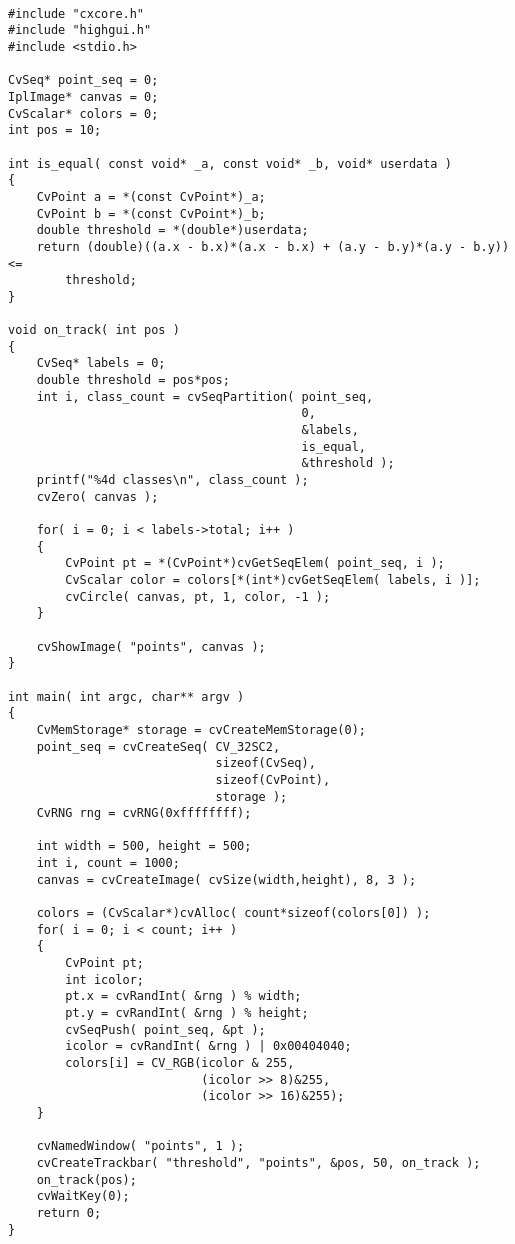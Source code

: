 \begin{lstlisting}

#include "cxcore.h"
#include "highgui.h"
#include <stdio.h>

CvSeq* point_seq = 0;
IplImage* canvas = 0;
CvScalar* colors = 0;
int pos = 10;

int is_equal( const void* _a, const void* _b, void* userdata )
{
    CvPoint a = *(const CvPoint*)_a;
    CvPoint b = *(const CvPoint*)_b;
    double threshold = *(double*)userdata;
    return (double)((a.x - b.x)*(a.x - b.x) + (a.y - b.y)*(a.y - b.y)) <=
        threshold;
}

void on_track( int pos )
{
    CvSeq* labels = 0;
    double threshold = pos*pos;
    int i, class_count = cvSeqPartition( point_seq,
                                         0,
                                         &labels,
                                         is_equal,
                                         &threshold );
    printf("%4d classes\n", class_count );
    cvZero( canvas );

    for( i = 0; i < labels->total; i++ )
    {
        CvPoint pt = *(CvPoint*)cvGetSeqElem( point_seq, i );
        CvScalar color = colors[*(int*)cvGetSeqElem( labels, i )];
        cvCircle( canvas, pt, 1, color, -1 );
    }

    cvShowImage( "points", canvas );
}

int main( int argc, char** argv )
{
    CvMemStorage* storage = cvCreateMemStorage(0);
    point_seq = cvCreateSeq( CV_32SC2,
                             sizeof(CvSeq),
                             sizeof(CvPoint),
                             storage );
    CvRNG rng = cvRNG(0xffffffff);

    int width = 500, height = 500;
    int i, count = 1000;
    canvas = cvCreateImage( cvSize(width,height), 8, 3 );

    colors = (CvScalar*)cvAlloc( count*sizeof(colors[0]) );
    for( i = 0; i < count; i++ )
    {
        CvPoint pt;
        int icolor;
        pt.x = cvRandInt( &rng ) % width;
        pt.y = cvRandInt( &rng ) % height;
        cvSeqPush( point_seq, &pt );
        icolor = cvRandInt( &rng ) | 0x00404040;
        colors[i] = CV_RGB(icolor & 255,
                           (icolor >> 8)&255,
                           (icolor >> 16)&255);
    }

    cvNamedWindow( "points", 1 );
    cvCreateTrackbar( "threshold", "points", &pos, 50, on_track );
    on_track(pos);
    cvWaitKey(0);
    return 0;
}
\end{lstlisting}


